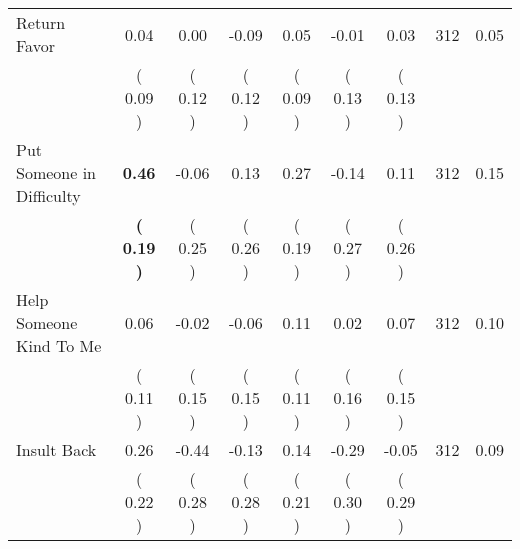 \begin{tabular}{lcccccccc}
Return Favor &      0.04 &      0.00 &     -0.09 &      0.05 &     -0.01 &      0.03 & 312 &       0.05 \\ 
 & (     0.09 ) & (     0.12 ) & (     0.12 ) & (     0.09 ) & (     0.13 ) & (     0.13 ) & \\
Put Someone in Difficulty & \textbf{     0.46} &     -0.06 &      0.13 &      0.27 &     -0.14 &      0.11 & 312 &       0.15 \\ 
 & \textbf{(     0.19 )} & (     0.25 ) & (     0.26 ) & (     0.19 ) & (     0.27 ) & (     0.26 ) & \\
Help Someone Kind To Me &      0.06 &     -0.02 &     -0.06 &      0.11 &      0.02 &      0.07 & 312 &       0.10 \\ 
 & (     0.11 ) & (     0.15 ) & (     0.15 ) & (     0.11 ) & (     0.16 ) & (     0.15 ) & \\
Insult Back &      0.26 &     -0.44 &     -0.13 &      0.14 &     -0.29 &     -0.05 & 312 &       0.09 \\ 
 & (     0.22 ) & (     0.28 ) & (     0.28 ) & (     0.21 ) & (     0.30 ) & (     0.29 ) & \\
\bottomrule
\end{tabular}
